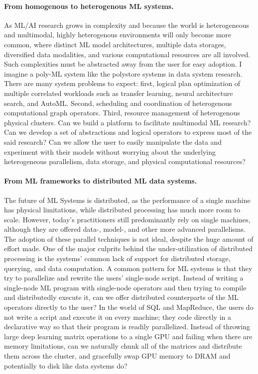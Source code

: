 \documentclass[letterpaper]{article}
\begin{document}
\paragraph{From homogenous to heterogenous ML systems.} As ML/AI research grows in complexity and because the world is heterogeneous and multimodal, highly heterogenous environments will only become more common, where distinct ML model architectures, multiple data storages, diversified data modalities, and various computational resources are all involved. Such complexities must be abstracted away from the user for easy adoption. I imagine a poly-ML system like the polystore systems in data system research. There are many system problems to expect: first, logical plan optimization of multiple correlated workloads such as transfer learning, neural architecture search, and AutoML. Second, scheduling and coordination of heterogenous computational graph operators. Third, resource management of heterogenous physical clusters. Can we build a platform to facilitate multimodal ML research? Can we develop a set of abstractions and logical operators to express most of the said research? Can we allow the user to easily manipulate the data and experiment with their models without worrying about the underlying heterogeneous parallelism, data storage, and physical computational resources? 

\paragraph{From ML frameworks to distributed ML data systems.} The future of ML Systems is distributed, as the performance of a single machine has physical limitations, while distributed processing has much more room to scale. However, today's practitioners still predominantly rely on single machines, although they are offered data-, model-, and other more advanced parallelisms. The adoption of these parallel techniques is not ideal, despite the huge amount of effort made. One of the major culprits behind the under-utilization of distributed processing is the systems' common lack of support for distributed storage, querying, and data computation. A common pattern for ML systems is that they try to parallelize and rewrite the users' single-node script. Instead of writing a single-node ML program with single-node operators and then trying to compile and distributedly execute it, can we offer distributed counterparts of the ML operators directly to the user? In the world of SQL and MapReduce, the users do not write a script and execute it on every machine; they code directly in a declarative way so that their program is readily parallelized. Instead of throwing large deep learning matrix operations to a single GPU and failing when there are memory limitations, can we naturally chunk all of the matrices and distribute them across the cluster, and gracefully swap GPU memory to DRAM and potentially to disk like data systems do? 
\end{document}
